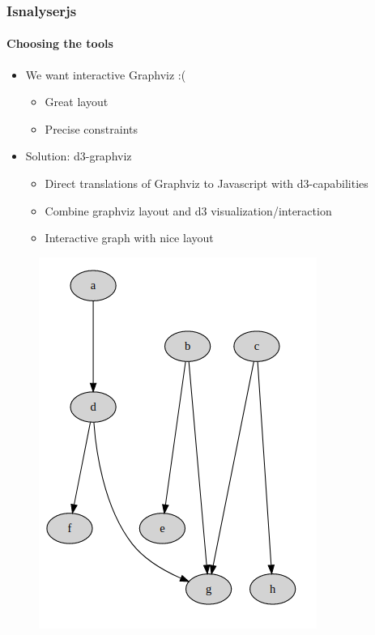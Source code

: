 \documentclass[9pt]{beamer}
\begin{document}
\begin{frame}
\frametitle{Isnalyserjs}
\framesubtitle{Choosing the tools}
\begin{itemize}%
	\item We want interactive Graphviz :(
	\begin{itemize}
		\item Great layout
		\item Precise constraints
	\end{itemize}
	\item Solution: d3-graphviz
	\begin{itemize}
		\item Direct translations of Graphviz to Javascript with d3-capabilities
		\item Combine graphviz layout and d3 visualization/interaction 
		\item Interactive graph with nice layout
	\end{itemize}
\end{itemize}
	\begin{figure}
	\flushright
	\includegraphics[width=.42\linewidth]{figures/d3_graphviz.png}
\end{figure}
\end{frame} 
\end{document}
